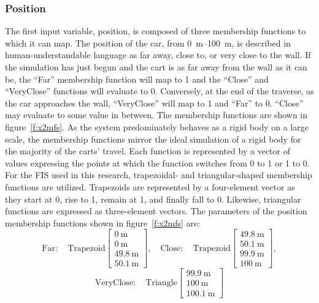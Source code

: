 \documentclass[submit]{aiaa-tc}%
\begin{document}
\subsubsection{Position}
The first input variable, position, is composed of three membership functions to which it can map. The position of the car, from \SIrange{0}{100}{\metre}, is described in human-understandable language as far away, close to, or very close to the wall. If the simulation has just begun and the cart is as far away from the wall as it can be, the ``Far'' membership function will map to 1 and the ``Close'' and ``VeryClose'' functions will evaluate to 0. Conversely, at the end of the traverse, as the car approaches the wall, ``VeryClose'' will map to 1 and ``Far'' to 0. ``Close'' may evaluate to some value in between. The membership functions are shown in figure~\vref{f:x2mfs}. As the system predominately behaves as a rigid body on a large scale, the membership functions mirror the ideal simulation of a rigid body for the majority of the carts' travel. Each function is represented by a vector of values expressing the points at which the function switches from 0 to 1 or 1 to 0. For the FIS used in this research, trapezoidal- and triangular-shaped membership functions are utilized. Trapezoids are represented by a four-element vector as they start at 0, rise to 1, remain at 1, and finally fall to 0. Likewise, triangular functions are expressed as three-element vectors. The parameters of the position membership functions shown in figure~\vref{f:x2mfs} are:
\begin{displaymath}
\mathrm{Far:}\quad \mathrm{Trapezoid}\begin{bmatrix}
\SI{0}{\metre}\\\SI{0}{\metre}\\\SI{49.8}{\metre}\\\SI{50.1}{\metre}
\end{bmatrix},
\quad
\mathrm{Close:}\quad \mathrm{Trapezoid}\begin{bmatrix}
\SI{49.8}{\metre}\\\SI{50.1}{\metre}\\\SI{99.9}{\metre}\\\SI{100}{\metre}
\end{bmatrix},
\end{displaymath}
\begin{displaymath}
\mathrm{VeryClose:}\quad \mathrm{Triangle}\begin{bmatrix}
\SI{99.9}{\metre}\\\SI{100}{\metre}\\\SI{100.1}{\metre}
\end{bmatrix}
\end{displaymath}
\end{document}
